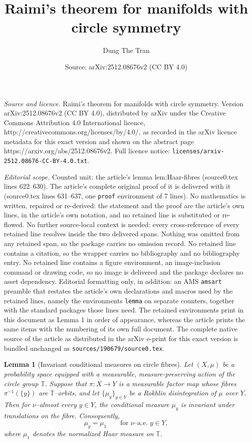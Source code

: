 \documentclass[10pt,a4paper]{amsart}
\title{Raimi's theorem for manifolds with circle symmetry}
\author{Dung The Tran}
\date{Source: arXiv:2512.08676v2 (CC BY 4.0)}
\newtheorem{lemma}{Lemma}
\begin{document}
\maketitle

\noindent\emph{Source and licence.} Raimi's theorem for manifolds with circle symmetry. Version arXiv:2512.08676v2 (CC BY 4.0), distributed by arXiv under the Creative Commons Attribution 4.0 International licence, http://creativecommons.org/licenses/by/4.0/, as recorded in the arXiv licence metadata for this exact version and shown on the abstract page https://arxiv.org/abs/2512.08676v2. Full licence notice: \texttt{licenses/arxiv-2512.08676-CC-BY-4.0.txt}.\par\smallskip

\noindent\textit{Editorial scope.} Counted unit: the article's lemma lem:Haar-fibres (source0.tex lines 622--630). The article's complete original proof of it is delivered with it (source0.tex lines 631--637, one \texttt{proof} environment of 7 lines). No mathematics is written, repaired or re-derived: the statement and the proof are the article's own lines, in the article's own notation, and no retained line is substituted or re-flowed.  No further source-local context is needed: every cross-reference of every retained line resolves inside the two delivered spans.  Nothing was omitted from any retained span, so the package carries no omission record.  No retained line contains a citation, so the wrapper carries no bibliography and no bibliography entry.  No retained line contains a figure environment, an image-inclusion command or drawing code, so no image is delivered and the package declares no asset dependency.  Editorial formatting only, in addition: an AMS \texttt{amsart} preamble that restates the article's own declarations and macros used by the retained lines, namely the environments \texttt{lemma} on separate counters, together with the standard packages those lines need.  The retained environments print in this document as Lemma 1 in order of appearance, whereas the article prints the same items with the numbering of its own full document.  The complete native source of the article as distributed in the arXiv e-print for this exact version is bundled unchanged as \texttt{sources/190679/source0.tex}.
\begin{lemma}[Invariant conditional measures on circle fibres]\label{lem:Haar-fibres}
Let $(X,\mu)$ be a probability space equipped with a measurable, measure-preserving action of the circle group $\mathbb{T}$.
Suppose that $\pi:X\to Y$ is a measurable factor map whose fibres $\pi^{-1}(\{y\})$ are $\mathbb{T}$--orbits, and let $\{\mu_y\}_{y\in Y}$ be a Rokhlin disintegration of $\mu$ over $Y$.
Then for $\nu$--almost every $y\in Y$, the conditional measure $\mu_y$ is invariant under translations on the fibre. Consequently,
\[
\mu_y = \mu_1 \qquad \text{for $\nu$--a.e.\ } y\in Y,
\]
where $\mu_1$ denotes the normalized Haar measure on $\mathbb{T}$.
\end{lemma}
\end{document}
